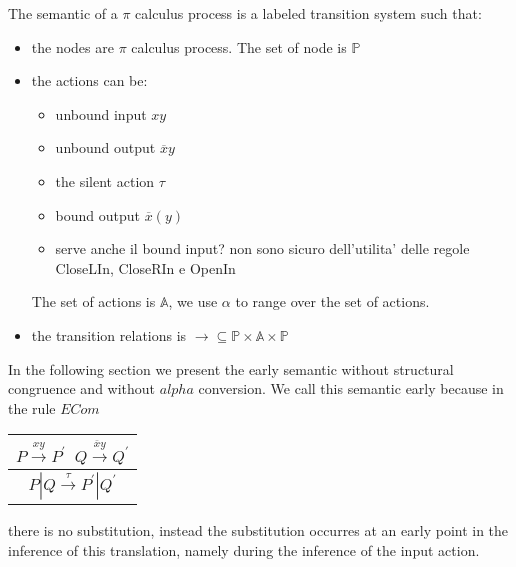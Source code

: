 The semantic of a $\pi$ calculus process is a labeled transition system such that:
\begin{itemize}
  \item 
    the nodes are $\pi$ calculus process. The set of node is $\mathbb{P}$
  \item
    the actions can be:
    \begin{itemize}
      \item unbound input $xy$
      \item unbound output $\overline{x}y$
      \item the silent action $\tau$
      \item bound output $\overline{x}(y)$
      \item serve anche il bound input? non sono sicuro dell'utilita' delle regole CloseLIn, CloseRIn e OpenIn
    \end{itemize}
    The set of actions is $\mathbb{A}$, we use $\alpha$ to range over the set of actions.
  \item
    the transition relations is $\rightarrow\subseteq \mathbb{P}\times \mathbb{A}\times \mathbb{P}$
\end{itemize}
In the following section we present the early semantic without structural congruence and without $alpha$ conversion. We call this semantic early because in the rule $ECom$
\begin{center}
  \begin{tabular}{c}
    $P \xrightarrow{xy} P^{'}\;\; Q\xrightarrow{\overline{x}y} Q^{'}$\\
    \hline
    $P|Q \xrightarrow{\tau} P^{'}|Q^{'}$
  \end{tabular}
\end{center}
there is no substitution, instead the substitution occurres at an early point in the inference of this translation, namely during the inference of the input action. 

